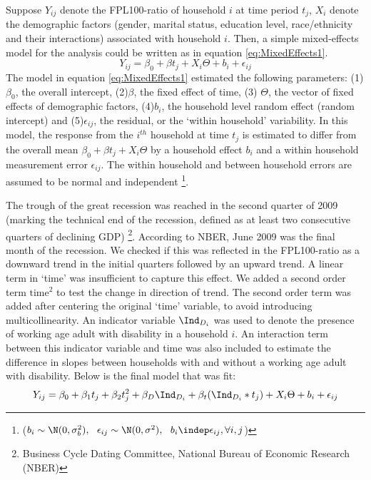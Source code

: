 \documentclass[11pt]{extarticle} %
\begin{document}
Suppose $Y_{ij}$ denote the FPL100-ratio of household $i$ at time period $t_j$, $X_i$ denote the demographic factors (gender, marital status, education level, race/ethnicity and their interactions) associated with household $i$. Then, a simple mixed-effects model for the analysis could be written as in equation \ref{eq:MixedEffects1}. 
\vspace{-0.5cm}
\begin{equation}
Y_{ij} = \beta_0 + \beta t_j + X_i\Theta + b_i + \epsilon_{ij}
\label{eq:MixedEffects1}
\end{equation}
The model in equation \ref{eq:MixedEffects1} estimated the following parameters: (1) $\beta_0$, the overall intercept, (2)$\beta$, the fixed effect of time, (3) $\Theta$, the vector of fixed effects of demographic factors, (4)$b_i$, the household level random effect (random intercept) and (5)$\epsilon_{ij}$, the residual, or the `within household' variability. %
In this model, the response from the $i^{th}$ household at time $t_j$ is estimated to differ from the overall mean $\beta_0 + \beta t_j + X_i\Theta$ by a household effect $b_i$ and a within household measurement error $\epsilon_{ij}$. The within household and between household errors are assumed to be normal and independent \footnote{($b_i \sim \N(0, \sigma^2_b),\ \ \epsilon_{ij} \sim \N(0, \sigma^2), \ \ b_i \indep \epsilon_{ij}, \forall i, j$)}.

The  trough of the great recession was reached in the second quarter of 2009 (marking the technical end of the recession, defined as at least two consecutive quarters of declining GDP) \footnote{Business Cycle Dating Committee, National Bureau of Economic Research (NBER)}. According to NBER, June 2009 was the final month of the recession. We checked if this was reflected in the FPL100-ratio as a downward trend in the initial quarters followed by an upward trend. A linear term in `time' was insufficient to capture this effect. We added a second order term $\text{time}^2$ to test the change in direction of trend. The second order term was added after centering the original `time' variable, to avoid introducing multicollinearity. An indicator variable $\Ind_{D_i}$ was used to denote the presence of working age adult with disability in a household $i$. An interaction term between this indicator variable and time was also included to estimate the difference in slopes between households with and without a working age adult with disability. Below is the final model that was fit: 
\vspace{-0.5cm}
\begin{equation}
Y_{ij} = \beta_0 + \beta_1 t_j + \beta_2 t_j^2 + \beta_D \Ind_{D_i} + \beta_t(\Ind_{D_i}*t_j) + X_i\Theta + b_i + \epsilon_{ij}
\label{eq:MixedEffects2}
\end{equation}
\end{document}

